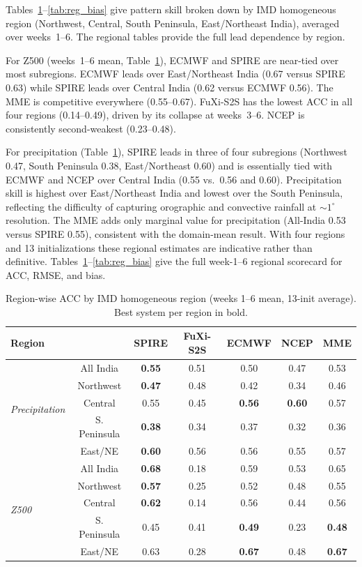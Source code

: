 \documentclass[11pt]{article}
\begin{document}
Tables~\ref{tab:reg_pcc}--\ref{tab:reg_bias} give pattern skill broken
down by IMD homogeneous region (Northwest, Central, South Peninsula,
East/Northeast India), averaged over weeks~1--6.
The regional tables provide the full lead dependence by region.

For Z500 (weeks~1--6 mean, Table~\ref{tab:reg_pcc}), ECMWF and SPIRE
are near-tied over most subregions. ECMWF leads over East/Northeast
India (0.67 versus SPIRE 0.63) while SPIRE leads over Central India
(0.62 versus ECMWF 0.56). The MME is competitive everywhere
(0.55--0.67). FuXi-S2S has the lowest ACC in all four regions
(0.14--0.49), driven by its collapse at weeks~3--6. NCEP is
consistently second-weakest (0.23--0.48).

For precipitation (Table~\ref{tab:reg_pcc}), SPIRE leads in three of
four subregions (Northwest 0.47, South Peninsula 0.38, East/Northeast
0.60) and is essentially tied with ECMWF and NCEP over Central India
(0.55 vs.\ 0.56 and 0.60). Precipitation skill is highest over
East/Northeast India and lowest over the South Peninsula, reflecting the
difficulty of capturing orographic and convective rainfall at
$\sim1^\circ$ resolution. The MME adds only marginal value for
precipitation (All-India 0.53 versus SPIRE 0.55), consistent with the
domain-mean result. With four regions and 13 initializations these
regional estimates are indicative rather than definitive.
Tables~\ref{tab:reg_pcc}--\ref{tab:reg_bias} give the full week-1--6
regional scorecard for ACC, RMSE, and bias.

\begin{table}[t]\centering
\small
\setlength{\tabcolsep}{5pt}
\caption{Region-wise ACC by IMD homogeneous region (weeks 1--6 mean,
13-init average). Best system per region in bold.}\label{tab:reg_pcc}
\begin{tabular}{lcccccc}\toprule
Region & & SPIRE & FuXi-S2S & ECMWF & NCEP & MME \\
\midrule
\multirow{5}{*}{\emph{Precipitation}} &
All India    & \textbf{0.55} & 0.51 & 0.50 & 0.47 & 0.53 \\
& Northwest    & \textbf{0.47} & 0.48 & 0.42 & 0.34 & 0.46 \\
& Central      & 0.55 & 0.45 & \textbf{0.56} & \textbf{0.60} & 0.57 \\
& S. Peninsula & \textbf{0.38} & 0.34 & 0.37 & 0.32 & 0.36 \\
& East/NE      & \textbf{0.60} & 0.56 & 0.56 & 0.55 & 0.57 \\
\midrule
\multirow{5}{*}{\emph{Z500}} &
All India    & \textbf{0.68} & 0.18 & 0.59 & 0.53 & 0.65 \\
& Northwest    & \textbf{0.57} & 0.25 & 0.52 & 0.48 & 0.55 \\
& Central      & \textbf{0.62} & 0.14 & 0.56 & 0.44 & 0.56 \\
& S. Peninsula & 0.45 & 0.41 & \textbf{0.49} & 0.23 & \textbf{0.48} \\
& East/NE      & 0.63 & 0.28 & \textbf{0.67} & 0.48 & \textbf{0.67} \\
\bottomrule
\end{tabular}\end{table}
\end{document}
